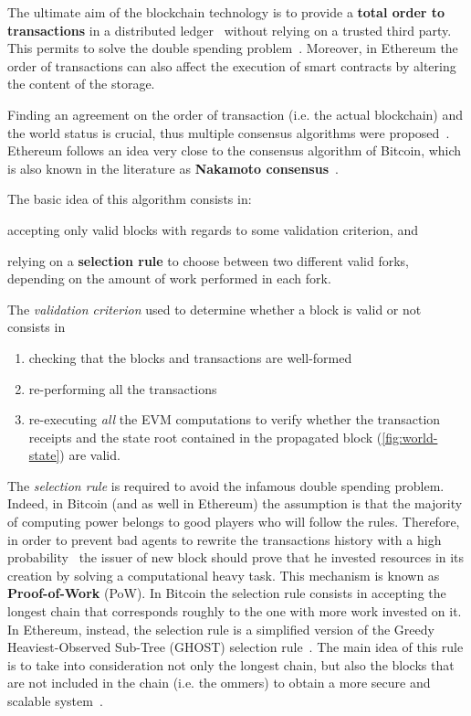 \label{sec:consensus}

The ultimate aim of the blockchain technology is to provide a \textbf{total
order to transactions} in a distributed ledger~\cite{bib:the-quest} without
relying on a trusted third party. This permits to solve the double spending
problem~\cite{bib:bitcoin}. Moreover, in Ethereum the order of transactions can
also affect the execution of smart contracts by altering the content of the
storage.

Finding an agreement on the order of transaction (i.e. the actual blockchain)
and the world status is crucial, thus multiple consensus algorithms were
proposed~\cite{}. Ethereum follows an idea very close to the consensus algorithm
of Bitcoin, which is also known in the literature as \textbf{Nakamoto
consensus}~\cite{}.

The basic idea of this algorithm consists in:
\begin{enumerate*}[label=(\arabic*)]
	\item accepting only valid blocks with regards to some validation criterion,
	and
	\item relying on a \textbf{selection rule} to choose between two different
	valid forks, depending on the amount of work performed in each fork.
\end{enumerate*}

The \emph{validation criterion} used to determine whether a block is valid or
not consists in
\begin{enumerate}
	\item checking that the blocks and transactions are well-formed
	\item re-performing all the transactions
	\item re-executing \emph{all}	the EVM computations to verify whether the
	transaction receipts and the state root contained in the propagated block
	(\autoref{fig:world-state}) are valid.
\end{enumerate}

The \emph{selection rule} is required to avoid the infamous double spending
problem. Indeed, in Bitcoin (and as well in Ethereum) the assumption is that the
majority of computing power belongs to good players who will follow the
rules. Therefore, in order to prevent bad agents
to rewrite the transactions history with a high probability~\cite{bib:bitcoin}
the issuer of new block should prove that he invested resources in its creation
by solving a computational heavy task. This mechanism is known as
\textbf{Proof-of-Work} (PoW). In Bitcoin the selection rule consists in
accepting the longest chain that corresponds roughly to the one with more work
invested on it. In Ethereum, instead, the selection rule is a simplified version
of the Greedy Heaviest-Observed Sub-Tree (GHOST) selection
rule~\cite{wood2018ethereum}. The main idea of this rule is to take into
consideration not only the longest chain, but also the blocks that are not
included in the chain (i.e. the ommers) to obtain a more secure and scalable
system~\cite{bib:ghost}.

